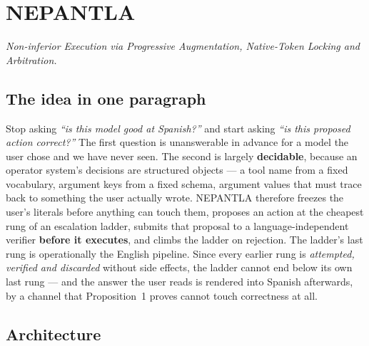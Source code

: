 %

\section{NEPANTLA}
\label{sec:nepantla}

\noindent\emph{Non-inferior Execution via Progressive Augmentation, Native-Token
Locking and Arbitration.}

\subsection{The idea in one paragraph}
\label{sec:nepantla-idea}

Stop asking \emph{``is this model good at Spanish?''} and start asking
\emph{``is this proposed action correct?''} The first question is unanswerable
in advance for a model the user chose and we have never seen. The second is
largely \textbf{decidable}, because an operator system's decisions are
structured objects --- a tool name from a fixed vocabulary, argument keys from a
fixed schema, argument values that must trace back to something the user
actually wrote. NEPANTLA therefore freezes the user's literals before anything
can touch them, proposes an action at the cheapest rung of an escalation ladder,
submits that proposal to a language-independent verifier \textbf{before it
executes}, and climbs the ladder on rejection. The ladder's last rung is
operationally the English pipeline. Since every earlier rung is \emph{attempted,
verified and discarded} without side effects, the ladder cannot end below its
own last rung --- and the answer the user reads is rendered into Spanish
afterwards, by a channel that Proposition~1 proves cannot touch correctness at
all.

\subsection{Architecture}
\label{sec:nepantla-architecture}

